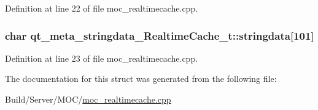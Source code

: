 Definition at line 22 of file moc\+\_\+realtimecache.\+cpp.

\hypertarget{structqt__meta__stringdata___realtime_cache__t_a5b3b2b4c42b48962e7b06d871ca66ef4}{}
\subsubsection[{stringdata}]{\setlength{\rightskip}{0pt plus 5cm}char qt\+\_\+meta\+\_\+stringdata\+\_\+\+Realtime\+Cache\+\_\+t\+::stringdata\mbox{[}101\mbox{]}}\label{structqt__meta__stringdata___realtime_cache__t_a5b3b2b4c42b48962e7b06d871ca66ef4}


Definition at line 23 of file moc\+\_\+realtimecache.\+cpp.



The documentation for this struct was generated from the following file\+:\begin{DoxyCompactItemize}
\item 
Build/\+Server/\+M\+O\+C/\hyperlink{moc__realtimecache_8cpp}{moc\+\_\+realtimecache.\+cpp}\end{DoxyCompactItemize}
